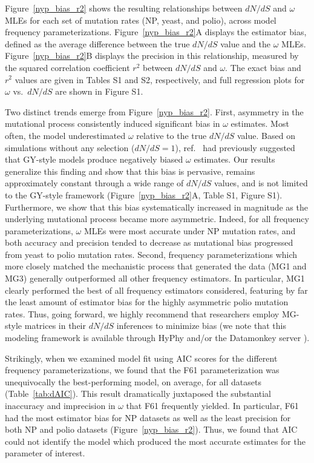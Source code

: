\documentclass[11pt]{article}
\begin{document}
Figure~\ref{nyp_bias_r2} shows the resulting relationships between $dN/dS$ and $\omega$ MLEs for each set of mutation rates (NP, yeast, and polio), across model frequency parameterizations. Figure~\ref{nyp_bias_r2}A displays the estimator bias, defined as the average difference between the true $dN/dS$ value and the $\omega$ MLEs. Figure~\ref{nyp_bias_r2}B displays the precision in this relationship, measured by the squared correlation coefficient $r^2$ between $dN/dS$ and $\omega$. The exact bias and $r^2$ values are given in Tables S1 and S2, respectively, and full regression plots for $\omega$ vs.\ $dN/dS$ are shown in Figure S1.

Two distinct trends emerge from Figure~\ref{nyp_bias_r2}. First, asymmetry in the mutational process consistently induced significant bias in $\omega$ estimates. Most often, the model underestimated $\omega$ relative to the true $dN/dS$ value. Based on simulations without any selection ($dN/dS = 1$), ref.\ \citep{Yap2010} had previously suggested that GY-style models produce negatively biased $\omega$ estimates. Our results generalize this finding and show that this bias is pervasive, remains approximately constant through a wide range of $dN/dS$ values, and is not limited to the GY-style framework (Figure~\ref{nyp_bias_r2}A, Table S1, Figure S1). Furthermore, we show that this bias systematically increased in magnitude as the underlying mutational process became more asymmetric. Indeed, for all frequency parameterizations, $\omega$ MLEs were most accurate under NP mutation rates, and both accuracy and precision tended to decrease as mutational bias progressed from yeast to polio mutation rates. Second, frequency parameterizations which more closely matched the mechanistic process that generated the data (MG1 and MG3) generally outperformed all other frequency estimators. In particular, MG1 clearly performed the best of all frequency estimators considered, featuring by far the least amount of estimator bias for the highly asymmetric polio mutation rates. Thus, going forward, we highly recommend that researchers employ MG-style matrices in their $dN/dS$ inferences to minimize bias (we note that this modeling framework is available through HyPhy \citep{KosakovskyPondetal2005} and/or the Datamonkey server \citep{Delport2010}).

Strikingly, when we examined model fit using AIC scores \citep{Akaike1974,BurnhamAnderson2004} for the different frequency parameterizations, we found that the F61 parameterization was unequivocally the best-performing model, on average, for all datasets (Table~\ref{tab:dAIC}). This result dramatically juxtaposed the substantial inaccuracy and imprecision in $\omega$ that F61 frequently yielded. In particular, F61 had the most estimator bias for NP datasets as well as the least precision for both NP and polio datasets (Figure~\ref{nyp_bias_r2}).  Thus, we found that AIC could not identify the model which produced the most accurate estimates for the parameter of interest.
\end{document}
